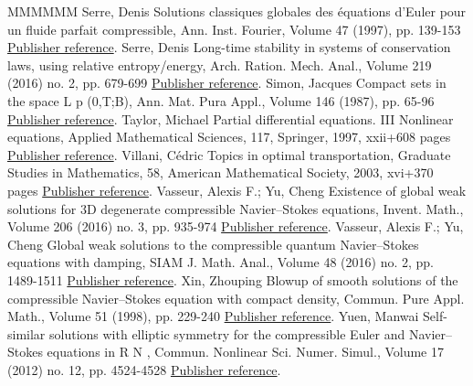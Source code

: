 \documentclass[11pt]{article}
\theoremstyle{definition}
\numberwithin{equation}{section}
\numberwithin{figure}{section}
\numberwithin{table}{section}
\newcommand*\<{\left\langle}
\renewcommand*\>{\right\rangle}
\begin{document}
\begin{thebibliography}{MMMMMM}
 Serre, Denis Solutions classiques globales des équations d’Euler pour un fluide parfait compressible, Ann. Inst. Fourier, Volume 47 (1997), pp. 139-153 \href{https://ahl.centre-mersenne.org/item/AHL_2018__1__47_0/#Serre97}{Publisher reference}.
 Serre, Denis Long-time stability in systems of conservation laws, using relative entropy/energy, Arch. Ration. Mech. Anal., Volume 219 (2016) no. 2, pp. 679-699 \href{https://ahl.centre-mersenne.org/item/AHL_2018__1__47_0/#Serre2017}{Publisher reference}.
 Simon, Jacques Compact sets in the space L p (0,T;B), Ann. Mat. Pura Appl., Volume 146 (1987), pp. 65-96 \href{https://ahl.centre-mersenne.org/item/AHL_2018__1__47_0/#Simon87}{Publisher reference}.
 Taylor, Michael Partial differential equations. III Nonlinear equations, Applied Mathematical Sciences, 117, Springer, 1997, xxii+608 pages \href{https://ahl.centre-mersenne.org/item/AHL_2018__1__47_0/#Taylor3}{Publisher reference}.
 Villani, Cédric Topics in optimal transportation, Graduate Studies in Mathematics, 58, American Mathematical Society, 2003, xvi+370 pages \href{https://ahl.centre-mersenne.org/item/AHL_2018__1__47_0/#Vi03}{Publisher reference}.
 Vasseur, Alexis F.; Yu, Cheng Existence of global weak solutions for 3D degenerate compressible Navier–Stokes equations, Invent. Math., Volume 206 (2016) no. 3, pp. 935-974 \href{https://ahl.centre-mersenne.org/item/AHL_2018__1__47_0/#VasseurYuInventiones}{Publisher reference}.
 Vasseur, Alexis F.; Yu, Cheng Global weak solutions to the compressible quantum Navier–Stokes equations with damping, SIAM J. Math. Anal., Volume 48 (2016) no. 2, pp. 1489-1511 \href{https://ahl.centre-mersenne.org/item/AHL_2018__1__47_0/#VasseurYu}{Publisher reference}.
 Xin, Zhouping Blowup of smooth solutions of the compressible Navier–Stokes equation with compact density, Commun. Pure Appl. Math., Volume 51 (1998), pp. 229-240 \href{https://ahl.centre-mersenne.org/item/AHL_2018__1__47_0/#Xin98}{Publisher reference}.
 Yuen, Manwai Self-similar solutions with elliptic symmetry for the compressible Euler and Navier–Stokes equations in R N , Commun. Nonlinear Sci. Numer. Simul., Volume 17 (2012) no. 12, pp. 4524-4528 \href{https://ahl.centre-mersenne.org/item/AHL_2018__1__47_0/#Yuen12}{Publisher reference}.
\end{thebibliography}
\end{document}
